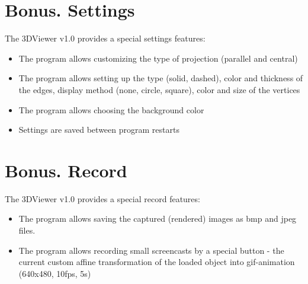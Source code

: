 \documentclass{article}
\begin{document}
\pagebreak
\section{Bonus. Settings}
The 3DViewer v1.0 provides a special settings features:
  \begin{itemize}
    \item The program allows customizing the type of projection (parallel and central)
    \item The program allows setting up the type (solid, dashed), color and thickness of the edges, display method (none, circle, square), color and size of the vertices
    \item The program allows choosing the background color
    \item Settings are saved between program restarts
  \end{itemize}

\section{Bonus. Record}
The 3DViewer v1.0 provides a special record features:
  \begin{itemize}
    \item The program allows saving the captured (rendered) images as bmp and jpeg files.
    \item The program allows recording small screencasts by a special button - the current custom affine transformation of the loaded object into gif-animation (640x480, 10fps, 5s)
  \end{itemize}
  
\end{document}
